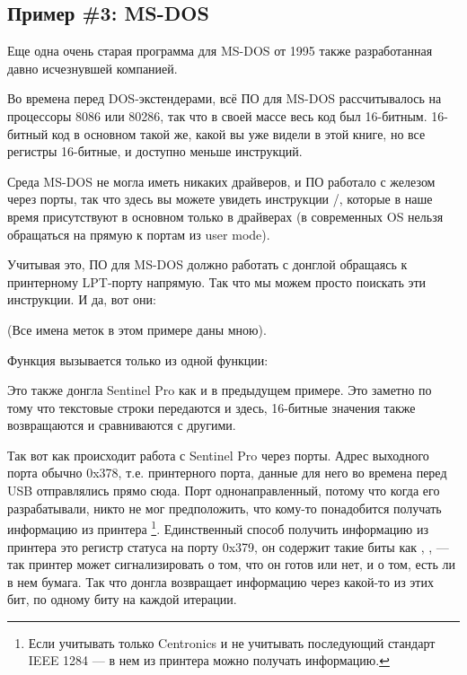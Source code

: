 \subsection{Пример \#3: MS-DOS}
\label{dongle_16bit_dos}

Еще одна очень старая программа для MS-DOS от 1995 
также разработанная давно исчезнувшей компанией.

Во времена перед DOS-экстендерами, всё ПО для MS-DOS рассчитывалось на процессоры 8086 или 80286,
так что в своей массе весь код был 16-битным.
16-битный код в основном такой же, какой вы уже видели в этой книге, но все регистры 16-битные,
и доступно меньше инструкций.

\label{IN_example}
\label{OUT_example}
Среда MS-DOS не могла иметь никаких драйверов, и ПО работало с  железом через порты,
так что здесь вы можете увидеть инструкции /, 
которые в наше время присутствуют в основном только
в драйверах (в современных OS нельзя обращаться на прямую к портам из \gls{user mode}).

Учитывая это, ПО для MS-DOS должно работать с донглой обращаясь к принтерному LPT-порту
напрямую.
Так что мы можем просто поискать эти инструкции. И да, вот они:



(Все имена меток в этом примере даны мною).

Функция  вызывается только из одной функции:



Это также  донгла Sentinel Pro как и в предыдущем примере.
Это заметно по тому что текстовые строки передаются и здесь, 16-битные значения также возвращаются и сравниваются с другими.

Так вот как происходит работа с Sentinel Pro через порты.
Адрес выходного порта обычно 0x378, т.е. принтерного порта, данные для него во времена
перед USB отправлялись прямо сюда.
Порт однонаправленный, потому что когда его разрабатывали, никто не мог предположить,
что кому-то понадобится получать информацию из принтера
\footnote{Если учитывать только Centronics и не учитывать последующий стандарт IEEE 1284 --- в нем
из принтера можно получать информацию.}.
Единственный способ получить информацию из принтера это регистр статуса на порту 0x379,
он содержит такие биты как , ,  --- так принтер может сигнализировать
о том, что он готов или нет, и о том, есть ли в нем бумага.
Так что донгла возвращает информацию через какой-то из этих бит, по одному биту на каждой
итерации.

